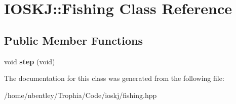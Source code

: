 \hypertarget{classIOSKJ_1_1Fishing}{\section{I\-O\-S\-K\-J\-:\-:Fishing Class Reference}
\label{classIOSKJ_1_1Fishing}
}
\subsection*{Public Member Functions}
\begin{DoxyCompactItemize}
\item 
\hypertarget{classIOSKJ_1_1Fishing_a4fe8874e2966eb554fd37b256978deb1}{void {\bfseries step} (void)}\label{classIOSKJ_1_1Fishing_a4fe8874e2966eb554fd37b256978deb1}

\end{DoxyCompactItemize}


The documentation for this class was generated from the following file\-:\begin{DoxyCompactItemize}
\item 
/home/nbentley/\-Trophia/\-Code/ioskj/fishing.\-hpp\end{DoxyCompactItemize}

